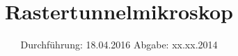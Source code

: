 


\subject{Versuchsprotokoll}
\title{Rastertunnelmikroskop}
\date{
  Durchführung: 18.04.2016
  \hspace{3em}
  Abgabe: xx.xx.2014
}




\maketitle
\thispagestyle{empty}







\printbibliography


